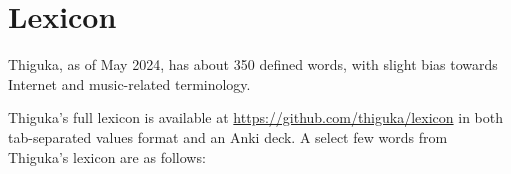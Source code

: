 
\chapter{Lexicon}
Thiguka, as of May 2024, has about 350 defined words, with slight bias towards Internet and music-related terminology.

Thiguka's full lexicon is available at \url{https://github.com/thiguka/lexicon} in both tab-separated values format and an Anki deck.
A select few words from Thiguka's lexicon are as follows:







